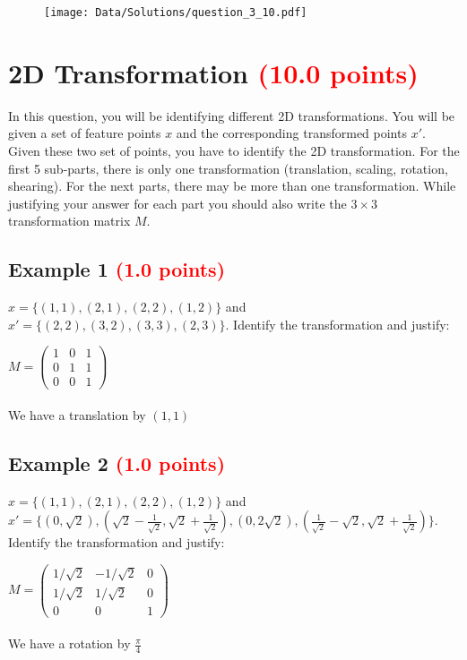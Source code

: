 \documentclass[answers]{exam}
\newcommand{\mypoints}[1]{\textcolor{red}{(#1 points)}}
\begin{document}
\begin{solution}
\begin{figure}[H]
    \centering
    \texttt{[image: Data/Solutions/question\_3\_10.pdf]}
\end{figure}
\end{solution}

\newpage
\section{2D Transformation \mypoints{10.0}}
In this question, you will be identifying different 2D transformations. You will be given a set of feature points $x$ and the corresponding transformed points $x'$. Given these two set of points, you have to identify the 2D transformation. For the first 5 sub-parts, there is only one transformation (translation, scaling, rotation, shearing). For the next parts, there may be more than one transformation.
While justifying your answer for each part you should also write the $3 \times 3$ transformation matrix $M$.

\subsection{Example 1 \mypoints{1.0}}
$x = \{(1,1), (2,1), (2,2), (1,2)\}$ and $x' = \{(2,2), (3,2), (3,3), (2,3)\}$. Identify the transformation and justify:
\begin{solution}
$
M = \begin{pmatrix}
1 & 0 & 1\\
0 & 1 & 1\\
0 & 0 & 1
\end{pmatrix}
$
\\\\
We have a translation by $(1, 1)$
\end{solution}

\subsection{Example 2 \mypoints{1.0}}
$x = \{(1,1), (2,1), (2,2), (1,2)\}$ and $x' = \{(0,\sqrt{2}), (\sqrt{2}-\frac{1}{\sqrt{2}},\sqrt{2}+\frac{1}{\sqrt{2}}), (0,2\sqrt{2}), (\frac{1}{\sqrt{2}}-\sqrt{2},\sqrt{2}+\frac{1}{\sqrt{2}})\}$. Identify the transformation and justify:
\begin{solution}
$
M = \begin{pmatrix}
1/\sqrt{2} & -1/\sqrt{2} & 0\\
1/\sqrt{2} & 1/\sqrt{2} & 0\\
0 & 0 & 1
\end{pmatrix}
$
\\\\
We have a rotation by $\frac{\pi}{4}$
\end{solution}
\end{document}
